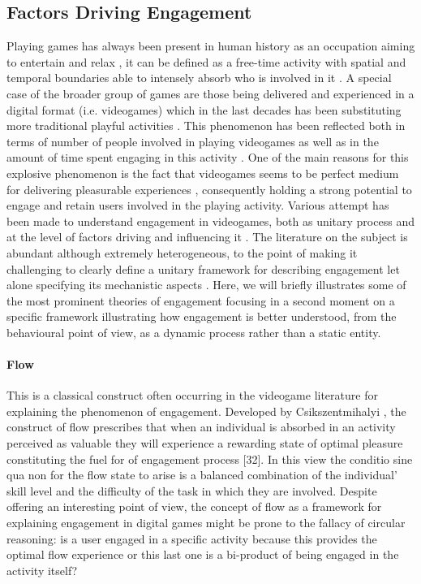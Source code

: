 \subsection{Factors Driving Engagement}
\label{factors_engagement}
Playing games has always been present in human history as an occupation aiming to entertain and relax \cite{connolly2012systematic}, it can be defined as a free-time activity with spatial and temporal boundaries able to intensely absorb who is involved in it \cite{connolly2012systematic}. A special case of the broader group of games are those being delivered and experienced in a digital format (i.e. videogames) which in the last decades has been substituting more traditional playful activities \cite{boyle2012engagement,connolly2012systematic}. This phenomenon has been reflected both in terms of number of people involved in playing videogames as well as in the amount of time spent engaging in this activity \cite{boyle2012engagement}. One of the main reasons for this explosive phenomenon is the fact that videogames seems to be perfect medium for delivering pleasurable experiences \cite{boyle2012engagement}, consequently holding a strong potential to engage and retain users involved in the playing activity. Various attempt has been made to understand engagement in videogames, both as unitary process and at the level of factors driving and influencing it \cite{boyle2012engagement}. The literature on the subject is abundant although extremely heterogeneous, to the point of making it challenging to clearly define a unitary framework for describing engagement let alone specifying its mechanistic aspects \cite{boyle2012engagement}. Here, we will briefly illustrates some of the most prominent theories of engagement focusing in a second moment on a specific framework illustrating  how engagement is better understood, from the behavioural point of view, as a dynamic process rather than a static entity.

\paragraph*{Flow} This is a classical construct often occurring in the videogame literature for explaining the phenomenon of engagement. Developed by Csikszentmihalyi \cite{csikszentmihalyi}, the construct of flow prescribes that when an individual is absorbed in an activity perceived as valuable they will experience a rewarding state of optimal pleasure constituting the fuel for of engagement process [32]. In this view the conditio sine qua non for the flow state to arise is a balanced combination of the individual’ skill level and the difficulty of the task in which they are involved. Despite offering an interesting point of view, the concept of flow as a framework for explaining engagement in digital games might be prone to the fallacy of circular reasoning: is a user engaged in a specific activity because this provides the optimal flow experience or this last one is a bi-product of being engaged in the activity itself? 

